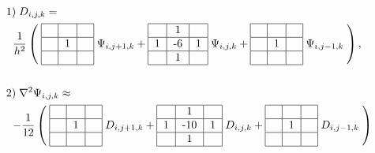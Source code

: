 \documentclass{article}
\begin{document}
\begin{alignat}{5}
&1) \; D_{i,j,k} = \label{3d2shocs}
\\
&\begin{tabular}{l} 
$\dfrac{1}{h^2}\left(\;
\begin{tabular}{|c|c|c|} \hline
  &   &   \\ \hline
 ~ & 1 & ~  \\ \hline
  &   &   \\ \hline
\end{tabular}
\;\Psi_{i,j+1,k} +
\begin{tabular}{|c|c|c|} \hline
  &  1 &   \\ \hline
1 & -6 & 1 \\ \hline
  &  1 &   \\ \hline
\end{tabular}
\;\Psi_{i,j,k} +
\begin{tabular}{|c|c|c|} \hline
  &   &   \\ \hline
 ~ & 1 & ~  \\ \hline
  &   &   \\ \hline
\end{tabular}
\;\Psi_{i,j-1,k}\;\right),$
\end{tabular} \notag
\\
\;&\; \notag
\\
&2) \; \nabla^2\Psi_{i,j,k} \approx \label{3d2shocs2} 
\\
&\begin{tabular}{l}
$-\dfrac{1}{12}\left(\;
\begin{tabular}{|c|c|c|} \hline
  &   &   \\ \hline
 ~ & 1 & ~ \\ \hline
  &   &   \\ \hline
\end{tabular}
\;D_{i,j+1,k} +
\begin{tabular}{|c|c|c|} \hline
  &   1 &   \\ \hline
1 & -10 & 1 \\ \hline
  &   1 &   \\ \hline
\end{tabular}
\;D_{i,j,k} +
\begin{tabular}{|c|c|c|} \hline
  &   &   \\ \hline
~  & 1 & ~  \\ \hline
  &   &   \\ \hline
\end{tabular}
\;D_{i,j-1,k} \; \right)$
\end{tabular} \notag
\\

\end{alignat}
\end{document}
